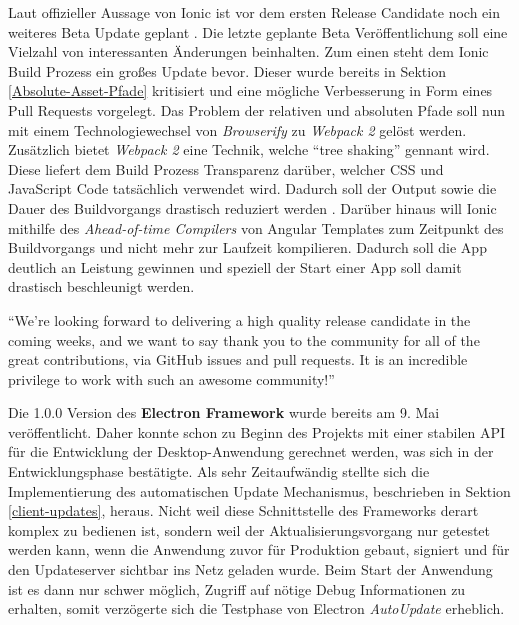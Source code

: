 Laut offizieller Aussage von Ionic ist vor dem ersten Release Candidate noch ein weiteres Beta Update geplant \cite{Annou88:online}.
Die letzte geplante Beta Veröffentlichung soll eine Vielzahl von interessanten
Änderungen beinhalten. Zum einen steht dem Ionic Build Prozess ein großes Update bevor.
Dieser wurde bereits in Sektion \ref{Absolute-Asset-Pfade} kritisiert und eine
mögliche Verbesserung in Form eines Pull Requests vorgelegt.
Das Problem der relativen und absoluten Pfade soll nun mit einem Technologiewechsel von \emph{Browserify} zu \emph{Webpack 2} gelöst werden.
Zusätzlich bietet \emph{Webpack 2} eine Technik, welche ``tree shaking'' gennant wird.
Diese liefert dem Build Prozess Transparenz darüber, welcher \ac{CSS} und JavaScript Code tatsächlich verwendet wird.
Dadurch soll der Output sowie die Dauer des Buildvorgangs drastisch reduziert werden \cite{Annou88:online}.
Darüber hinaus will Ionic mithilfe des \emph{Ahead-of-time Compilers} von Angular Templates zum Zeitpunkt des Buildvorgangs und nicht mehr zur Laufzeit kompilieren.
Dadurch soll die App deutlich an Leistung gewinnen und speziell der Start einer App soll damit drastisch beschleunigt werden.

\vspace{0.3cm}

``We’re looking forward to delivering a high quality release candidate in the coming weeks,
and we want to say thank you to the community for all of the great contributions,
via GitHub issues and pull requests. It is an incredible privilege to work with such an awesome community!'' \cite{Annou88:online}

\vspace{0.3cm}

\noindent
Die 1.0.0 Version des \textbf{Electron Framework} wurde bereits am 9. Mai veröffentlicht.
Daher konnte schon zu Beginn des Projekts \projectname{} mit einer stabilen API für die Entwicklung
der Desktop-Anwendung gerechnet werden, was sich in der Entwicklungsphase bestätigte.
Als sehr Zeitaufwändig stellte sich die Implementierung des automatischen
Update Mechanismus, beschrieben in Sektion \ref{client-updates}, heraus.
Nicht weil diese Schnittstelle des Frameworks derart komplex zu bedienen ist, sondern weil der Aktualisierungsvorgang nur getestet werden kann,
wenn die Anwendung zuvor für Produktion gebaut, signiert und für den Updateserver sichtbar ins Netz geladen wurde.
Beim Start der Anwendung ist es dann nur schwer möglich, Zugriff auf nötige Debug Informationen zu erhalten,
somit verzögerte sich die Testphase von Electron \emph{AutoUpdate} erheblich.



